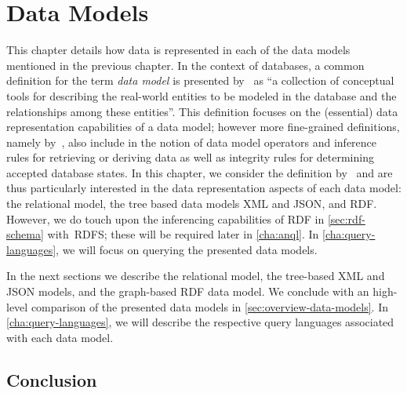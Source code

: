 \chapter{Data Models}
\label{cha:data-models}



This chapter details how data is represented in each of the data models mentioned in the previous chapter.
%
In the context of databases, a common definition for the term \emph{data model} is presented
by~\citet{SilberschatzKorthSudarshan:1996aa} as ``a collection of conceptual tools for describing the real-world
entities to be modeled in the database and the relationships among these entities''.
% 
This definition focuses on the (essential) data representation capabilities of a data model; however more fine-grained
definitions, namely by~\citet{Codd:1980aa}, also include in the notion of data model operators and inference rules for
retrieving or deriving data as well as integrity rules for determining accepted database states.
% 
In this chapter, we consider the definition by~\citet{SilberschatzKorthSudarshan:1996aa} and are thus particularly
interested in the data representation aspects of each data model: the relational model, the tree based data models
\ac{XML} and \acs{JSON}, and \ac{RDF}.
%
However, we do touch upon the inferencing capabilities of \ac{RDF} in \cref{sec:rdf-schema} with~\acl{RDFS}; these will
be required later in \cref{cha:anql}.
%
In \cref{cha:query-languages}, we will focus on querying the presented data models.



\bigskip


In the next sections we describe the relational model, the tree-based \ac{XML} and \ac{JSON} models, and the graph-based
\ac{RDF} data model.  We conclude with an high-level comparison of the presented data models in
\cref{sec:overview-data-models}.
%
In \cref{cha:query-languages}, we will describe the respective query languages associated with each data model.













\section{Conclusion}
\label{sec:conclusion-data-models}

